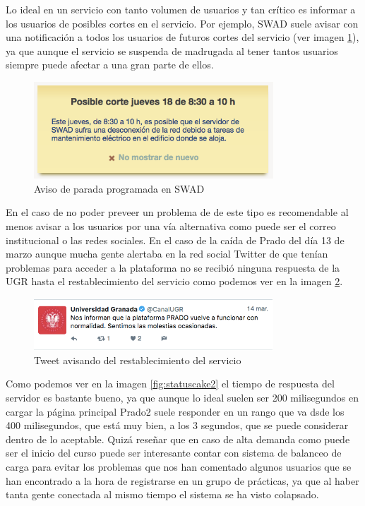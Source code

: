 Lo ideal en un servicio con tanto volumen de usuarios y tan crítico es informar a los usuarios de posibles cortes en el servicio. Por ejemplo, SWAD suele avisar con una notificación a todos los usuarios de futuros cortes del servicio (ver imagen \ref{fig:paroprogramadoswad}), ya que aunque el servicio se suspenda de madrugada al tener tantos usuarios siempre puede afectar a una gran parte de ellos. 

\begin{figure}[h!]
\centering
\includegraphics[width=0.8\textwidth]{../images/paroprogramadoswad}
\caption{Aviso de parada programada en SWAD}
\label{fig:paroprogramadoswad}
\end{figure}

En el caso de no poder preveer un problema de de este tipo es recomendable al menos avisar a los usuarios por una vía alternativa como puede ser el correo institucional o las redes sociales. En el caso de la caída de Prado del día 13  de marzo aunque mucha gente alertaba en la red social Twitter de que tenían problemas para acceder a la plataforma no se recibió ninguna respuesta de la UGR hasta el restablecimiento del servicio como podemos ver en la imagen \ref{fig:tweet}. 



\begin{figure}[h!]
\centering
\includegraphics[width=0.8\textwidth]{../images/tweet}
\caption{Tweet avisando del restablecimiento del servicio}
\label{fig:tweet}
\end{figure}

Como podemos ver en la imagen \ref{fig:statuscake2} el tiempo de respuesta del servidor es bastante bueno, ya que aunque lo ideal suelen ser 200 milisegundos en cargar la página principal Prado2 suele responder en un rango que va dsde los 400 milisegundos, que está muy bien, a los 3 segundos, que se puede considerar dentro de lo aceptable. Quizá reseñar que en caso de alta demanda como puede ser el inicio del curso puede ser interesante contar con sistema de balanceo de carga para evitar los problemas que nos han comentado algunos usuarios que se han encontrado a la hora de registrarse en un grupo de prácticas, ya que al haber tanta gente conectada al mismo tiempo el sistema se ha visto colapsado. 



